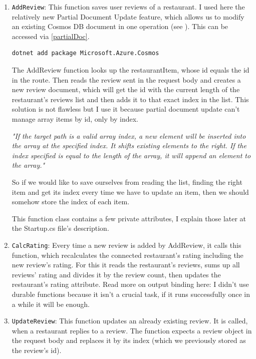 \begin{enumerate}
	\item \verb+AddReview+: This function saves user reviews of a restaurant. I used here the relatively new Partial Document Update feature, which allows us to modify an existing Cosmos DB document in one operation (see \cite{CosmosDBPartialDocumentUpdate}). This can be accessed via \ref{partialDoc}. 
	
	\lstset{ breaklines=true }
	\begin{lstlisting}[frame=single,float=!ht, caption=Adding Partial Document Update to a Function App, label=partialDoc]
		dotnet add package Microsoft.Azure.Cosmos
	\end{lstlisting}

	The AddReview function looks up the restaurantItem, whose id equals the id in the route. Then reads the review sent in the request body and creates a new review document, which will get the id with the current length of the restaurant's reviews list and then adds it to that exact index in the list. This solution is not flawless but I use it because partial document update can't manage array items by id, only by index. 	
	
	\emph{"If the target path is a valid array index, a new element will be inserted into the array at the specified index. It shifts existing elements to the right.
	If the index specified is equal to the length of the array, it will append an element to the array."  \cite{CosmosDBPartialDocumentUpdate}}
 	
	So if we would like to save ourselves from reading the list, finding the right item and get its index every time we have to update an item, then we should somehow store the index of each item. 
	
	This function class contains a few private attributes, I explain those later at the Startup.cs file's description.
	
	\item \verb+CalcRating+: Every time a new review is added by AddReview, it calls this function, which recalculates the connected restaurant's rating including the new review's rating. For this it reads the restaurant's reviews, sums up all reviews' rating and divides it by the review count, then updates the restaurant's rating attribute. Read more on output binding here: \cite{CosmosDBOutputBinding}
	I didn't use durable functions because it isn't a crucial task, if it runs successfully once in a while it will be enough.
	
	\item \verb+UpdateReview+: This function updates an already existing review. It is called, when a restaurant replies to a review. The function expects a review object in the request body and replaces it by its index (which we previously stored as the review's id). 
\end{enumerate}

